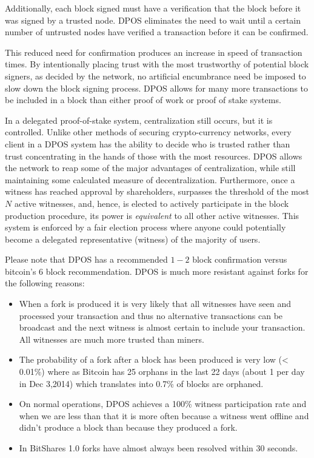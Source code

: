 Additionally, each block signed must have a verification that the block
before it was signed by a trusted node. DPOS eliminates the need to wait until
a certain number of untrusted nodes have verified a transaction before it can
be confirmed.

This reduced need for confirmation produces an increase in speed of transaction
times. By intentionally placing trust with the most trustworthy of potential
block signers, as decided by the network, no artificial encumbrance need be
imposed to slow down the block signing process. DPOS allows for many more
transactions to be included in a block than either proof of work or proof of
stake systems.

In a delegated proof-of-stake system, centralization still occurs, but it is
controlled. Unlike other methods of securing crypto-currency networks, every
client in a DPOS system has the ability to decide who is trusted rather than
trust concentrating in the hands of those with the most resources. DPOS allows
the network to reap some of the major advantages of centralization, while still
maintaining some calculated measure of decentralization. Furthermore, once a
witness has reached approval by shareholders, surpasses the threshold of the
most $N$ active witnesses, and, hence, is elected to actively participate in
the block production procedure, its power is \emph{equivalent} to all other
active witnesses. This system is enforced by a fair election process where
anyone could potentially become a delegated representative (witness) of the
majority of users.

Please note that DPOS has a recommended $1-2$ block confirmation versus
bitcoin's 6 block recommendation. DPOS is much more resistant against forks for
the following reasons:
\begin{itemize}
\item When a fork is produced it is
      very likely that all witnesses have seen and processed your transaction and
      thus no alternative transactions can be broadcast and the next witness is
      almost certain to include your transaction. All witnesses are much more
      trusted than miners.
\item The probability of a fork after a block has been produced is very low (<
      0.01\%) where as Bitcoin has 25 orphans in the last 22 days (about 1 per day in
      Dec 3,2014) which translates into 0.7\% of blocks are orphaned.
\item On normal operations, DPOS achieves a 100\% witness participation rate and when
      we are less than that it is more often because a witness went offline and didn't
      produce a block than because they produced a fork. 
\item In BitShares 1.0 forks have almost always been resolved within 30 seconds. 
\end{itemize}

